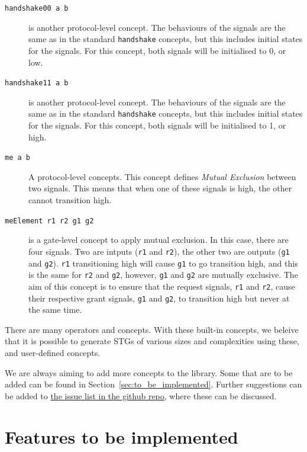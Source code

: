 \documentclass{proc}
\begin{document}
\begin{description}
  \item [\texttt{handshake00 a b}] is another protocol-level concept. The behaviours of the signals are the same as in the standard \texttt{handshake} concepts, but this includes initial 
  states for the signals. For this concept, both signals will be initialised to 0, or low.
  
  \item [\texttt{handshake11 a b}] is another protocol-level concept. The behaviours of the signals are the same as in the standard \texttt{handshake} concepts, but this includes initial 
  states for the signals. For this concept, both signals will be initialised to 1, or high.
  
  \item [\texttt{me a b}] A protocol-level concepts. This concept defines \emph{Mutual Exclusion} between two signals. 
  This means that when one of these signals is high, the other cannot transition high.
  
  \item [\texttt{meElement r1 r2 g1 g2}] is a gate-level concept to apply mutual exclusion. In this case, there are four signals. Two are intputs (\texttt{r1} and \texttt{r2}), the other two 
  are outputs (\texttt{g1} and \texttt{g2}). \texttt{r1} transitioning high will cause \texttt{g1} to go transition high, and this is the same for \texttt{r2} and \texttt{g2}, however,
  \texttt{g1} and \texttt{g2} are mutually exclusive. The aim of this concept is to ensure that the request signals, \texttt{r1} and \texttt{r2}, cause their respective grant signals, 
  \texttt{g1} and \texttt{g2}, to transition high but never at the same time. 
  
\end{description}

There are many operators and concepts. With these built-in concepts, we beleive that it is possible to generate STGs of various sizes and complexities using these, and user-defined 
concepts. 

We are always aiming to add more concepts to the library. Some that are to be added can be found in Section~\ref{sec:to_be_implemented}. 
Further suggestions can be added to \href{https://github.com/tuura/concepts/issues}{the issue list in the github repo}, where these can be discussed.

\section{Features to be implemented \label{sec:to_be_implemented}}
\end{document}
